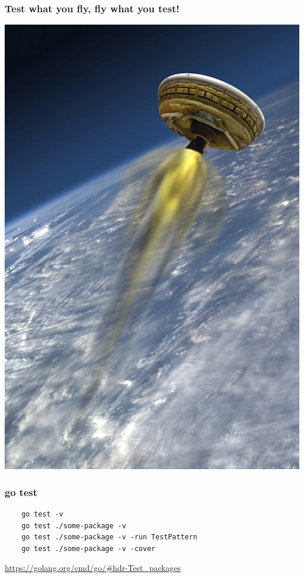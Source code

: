 \documentclass[aspectratio=169]{beamer}
\begin{document}
\begin{frame}
  \frametitle{Test what you fly, fly what you test!}

  \includegraphics[scale=.35]{images/PIA18017_hires.jpg}
  
\end{frame}

\begin{frame}[fragile]
  \frametitle{go test}

  \begin{lstlisting}
    go test -v
    go test ./some-package -v
    go test ./some-package -v -run TestPattern
    go test ./some-package -v -cover
  \end{lstlisting}
  
  \url{https://golang.org/cmd/go/\#hdr-Test\_packages}
  
\end{frame}
\end{document}
